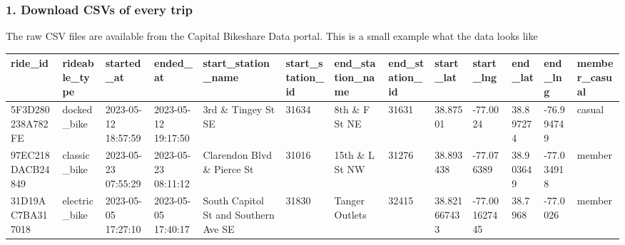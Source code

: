 \documentclass{beamer}
\begin{document}
\begin{frame}
    \frametitle{1. Download CSVs of every trip}
    The raw CSV files are available from the Capital Bikeshare Data portal. This is a small example what the data looks like
    \begin{table}[]
        \begin{tabular}{lllllllllllll}
            \hline
            \multicolumn{1}{|l|}{ride\_id} & \multicolumn{1}{l|}{rideable\_type} & \multicolumn{1}{l|}{started\_at} & \multicolumn{1}{l|}{ended\_at} & \multicolumn{1}{l|}{start\_station\_name} & \multicolumn{1}{l|}{start\_station\_id} & \multicolumn{1}{l|}{end\_station\_name} & \multicolumn{1}{l|}{end\_station\_id} & \multicolumn{1}{l|}{start\_lat} & \multicolumn{1}{l|}{start\_lng} & \multicolumn{1}{l|}{end\_lat} & \multicolumn{1}{l|}{end\_lng} & \multicolumn{1}{l|}{member\_casual} \\ \hline
            5F3D280238A782FE               & docked\_bike                        & 2023-05-12 18:57:59              & 2023-05-12 19:17:50            & 3rd \& Tingey St SE                       & 31634                                   & 8th \& F St NE                          & 31631                                 & 38.87501                        & -77.0024                        & 38.897274                     & -76.994749                    & casual                              \\
            97EC218DACB24849               & classic\_bike                       & 2023-05-23 07:55:29              & 2023-05-23 08:11:12            & Clarendon Blvd \& Pierce St               & 31016                                   & 15th \& L St NW                         & 31276                                 & 38.893438                       & -77.076389                      & 38.903649                     & -77.034918                    & member                              \\
            31D19AC7BA317018               & electric\_bike                      & 2023-05-05 17:27:10              & 2023-05-05 17:40:17            & South Capitol St and Southern Ave SE      & 31830                                   & Tanger Outlets                          & 32415                                 & 38.821667433                    & -77.001627445                   & 38.7968                       & -77.0026                      & member
        \end{tabular}
    \end{table}
\end{frame}
\end{document}
